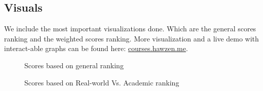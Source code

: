 \documentclass[12pt,a4paper]{article}
\begin{document}
\subsection{Visuals}
We include the most important visualizations done. Which are the general scores ranking and the weighted scores ranking. More visualization and a live demo with interact-able graphs can be found here: \href{http://courses.hawzen.me}{courses.hawzen.me}.

\begin{figure}
    \centering
    \hskip-1.7cm 
    \caption{Scores based on general ranking}
    \label{fig:general_ranking}
\end{figure}

\begin{figure}
    \centering
    \caption{Scores based on Real-world Vs. Academic ranking}
    \label{fig:real_vs_academic}
\end{figure}
\end{document}
